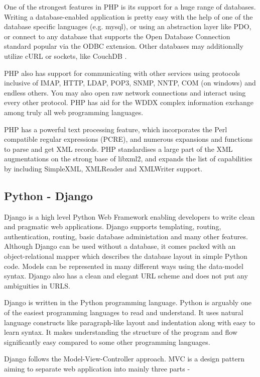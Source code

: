 \documentclass[../thesis.tex]{subfiles}
\begin{document}
One of the strongest features in PHP is its support for a huge range of databases. Writing a database-enabled application is pretty easy with the help of one of the database specific languages (e.g. mysql), or using an abstraction layer like PDO, or connect to any database that supports the Open Database Connection standard popular via the ODBC extension. Other databases may additionally utilize cURL or sockets, like CouchDB \cite{php}.
\newline
    
PHP also has support for communicating with other services using protocols inclusive of IMAP, HTTP, LDAP, POP3, SNMP, NNTP, COM (on windows) and endless others. You may also open raw network connections and interact using every other protocol. PHP has aid for the WDDX complex information exchange among truly all web programming languages.
\newline
    
PHP has a powerful text processing feature, which incorporates the Perl compatible regular expressions (PCRE), and numerous expansions and functions to parse and get XML records. PHP standardises a large part of the XML augmentations on the strong base of libxml2, and expands the list of capabilities by including SimpleXML, XMLReader and XMLWriter support.

\subsection{Python - Django}
Django is a high level Python Web Framework enabling developers to write clean and pragmatic web applications. Django supports templating, routing, authentication, routing, basic database administation and many other features. Although Django can be used without a database, it comes packed with an object-relational mapper which describes the database layout in simple Python code. Models can be represented in many different ways using the data-model syntax. Django also has a clean and elegant URL scheme and does not put any ambiguities in URLS.

Django is written in the Python programming language. Python is arguably one of the easiest programming languages to read and understand. It uses natural language constructs like paragraph-like layout and indentation along with easy to learn syntax. It makes understanding the structure of the program and flow significantly easy compared to some other programming languages.

Django follows the Model-View-Controller approach. MVC is a design pattern aiming to separate web application into mainly three parts -
\newline
    
\end{document}
